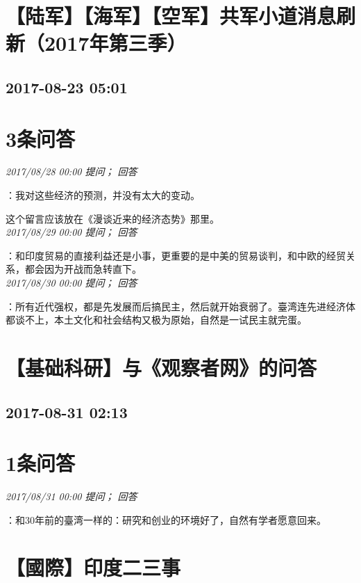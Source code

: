 \documentclass[twocolumn]{ctexart}
\begin{document}
\section{【陆军】【海军】【空军】共军小道消息刷新（2017年第三季）}
\subsection{2017-08-23 05:01}


\section{3条问答}

\textit{\hfill\noindent\small 2017/08/28 00:00 提问； 回答}

：我对这些经济的预测，并没有太大的变动。

这个留言应该放在《漫谈近来的经济态势》那里。\\

\textit{\hfill\noindent\small 2017/08/29 00:00 提问； 回答}

：和印度贸易的直接利益还是小事，更重要的是中美的贸易谈判，和中欧的经贸关系，都会因为开战而急转直下。\\

\textit{\hfill\noindent\small 2017/08/30 00:00 提问； 回答}

：所有近代强权，都是先发展而后搞民主，然后就开始衰弱了。臺湾连先进经济体都谈不上，本土文化和社会结构又极为原始，自然是一试民主就完蛋。\\


\section{【基础科研】与《观察者网》的问答}
\subsection{2017-08-31 02:13}


\section{1条问答}

\textit{\hfill\noindent\small 2017/08/31 00:00 提问； 回答}

：和30年前的臺湾一样的：研究和创业的环境好了，自然有学者愿意回来。\\


\section{【國際】印度二三事}
\end{document}
